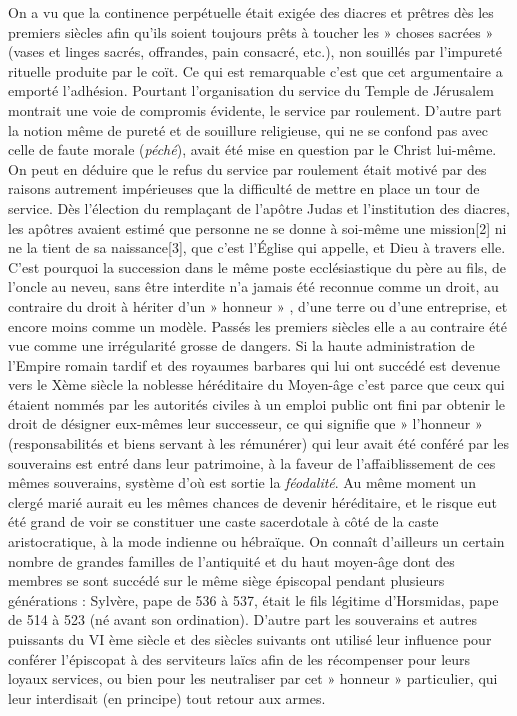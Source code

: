  On a vu que la continence perpétuelle était exigée des diacres et prêtres dès les premiers siècles afin qu'ils soient toujours prêts à toucher les » choses sacrées » (vases et linges sacrés, offrandes, pain consacré, etc.), non souillés par l'impureté rituelle produite par le coït. Ce qui est remarquable c'est que cet argumentaire a emporté l'adhésion. Pourtant l'organisation du service du Temple de Jérusalem montrait une voie de compromis évidente, le service par roulement. D'autre part la notion même de pureté et de souillure religieuse, qui ne se confond pas avec celle de faute morale (\emph{péché}), avait été mise en question par le Christ lui-même. On peut en déduire que le refus du service par roulement était motivé par des raisons autrement impérieuses que la difficulté de mettre en place un tour de service. 
 Dès l'élection du remplaçant de l'apôtre Judas et l'institution des diacres, les apôtres avaient estimé que personne ne se donne à soi-même une mission[2] ni ne la tient de sa naissance[3], que c'est l'Église qui appelle, et Dieu à travers elle. C'est pourquoi la succession dans le même poste ecclésiastique du père au fils, de l'oncle au neveu, sans être interdite n'a jamais été reconnue comme un droit, au contraire du droit à hériter d'un » honneur » , d'une terre ou d'une entreprise, et encore moins comme un modèle. Passés les premiers siècles elle a au contraire été vue comme une irrégularité grosse de dangers. 
 Si la haute administration de l'Empire romain tardif et des royaumes barbares qui lui ont succédé est devenue vers le Xème siècle la noblesse héréditaire du Moyen-âge c'est parce que ceux qui étaient nommés par les autorités civiles à un emploi public ont fini par obtenir le droit de désigner eux-mêmes leur successeur, ce qui signifie que » l'honneur » (responsabilités et biens servant à les rémunérer) qui leur avait été conféré par les souverains est entré dans leur patrimoine, à la faveur de l'affaiblissement de ces mêmes souverains, système d'où est sortie la \emph{féodalité}. Au même moment un clergé marié aurait eu les mêmes chances de devenir héréditaire, et le risque eut été grand de voir se constituer une caste sacerdotale à côté de la caste aristocratique, à la mode indienne ou hébraïque. On connaît d'ailleurs un certain nombre de grandes familles de l'antiquité et du haut moyen-âge dont des membres se sont succédé sur le même siège épiscopal pendant plusieurs générations : Sylvère, pape de 536 à 537, était le fils légitime d'Horsmidas, pape de 514 à 523 (né avant son ordination). D'autre part les souverains et autres puissants du VI ème siècle et des siècles suivants ont utilisé leur influence pour conférer l'épiscopat à des serviteurs laïcs afin de les récompenser pour leurs loyaux services, ou bien pour les neutraliser par cet » honneur » particulier, qui leur interdisait (en principe) tout retour aux armes. 
